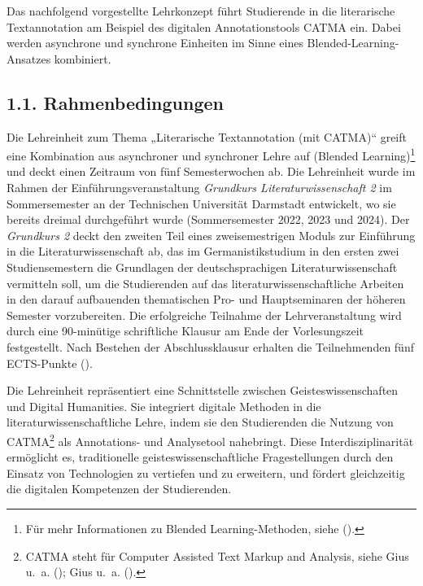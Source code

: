 \documentclass[
          a4paper,
        ]{article}
\begin{document}
Das nachfolgend vorgestellte Lehrkonzept führt Studierende in die
literarische Textannotation am Beispiel des digitalen Annotationstools
CATMA ein. Dabei werden asynchrone und synchrone Einheiten im Sinne
eines Blended-Learning-Ansatzes kombiniert.

\subsection{1.1. Rahmenbedingungen}\label{rahmenbedingungen}

Die Lehreinheit zum Thema „Literarische Textannotation (mit CATMA)``
greift eine Kombination aus asynchroner und synchroner Lehre auf
(Blended Learning)\footnote{Für mehr Informationen zu Blended
  Learning-Methoden, siehe ().} und deckt einen Zeitraum von fünf
Semesterwochen ab. Die Lehreinheit wurde im Rahmen der
Einführungsveranstaltung \emph{Grundkurs Literaturwissenschaft 2} im
Sommersemester an der Technischen Universität Darmstadt entwickelt, wo
sie bereits dreimal durchgeführt wurde (Sommersemester 2022, 2023 und
2024). Der \emph{Grundkurs 2} deckt den zweiten Teil eines
zweisemestrigen Moduls zur Einführung in die Literaturwissenschaft ab,
das im Germanistikstudium in den ersten zwei Studiensemestern die
Grundlagen der deutschsprachigen Literaturwissenschaft vermitteln soll,
um die Studierenden auf das literaturwissenschaftliche Arbeiten in den
darauf aufbauenden thematischen Pro- und Hauptseminaren der höheren
Semester vorzubereiten. Die erfolgreiche Teilnahme der Lehrveranstaltung
wird durch eine 90-minütige schriftliche Klausur am Ende der
Vorlesungszeit festgestellt. Nach Bestehen der Abschlussklausur erhalten
die Teilnehmenden fünf ECTS-Punkte
().

Die Lehreinheit repräsentiert eine Schnittstelle zwischen
Geisteswissenschaften und Digital Humanities. Sie integriert digitale
Methoden in die literaturwissenschaftliche Lehre, indem sie den
Studierenden die Nutzung von CATMA\footnote{CATMA steht für Computer
  Assisted Text Markup and Analysis, siehe Gius u.~a.
  (); Gius u.~a.
  ().} als Annotations- und
Analysetool nahebringt. Diese Interdisziplinarität ermöglicht es,
traditionelle geisteswissenschaftliche Fragestellungen durch den Einsatz
von Technologien zu vertiefen und zu erweitern, und fördert gleichzeitig
die digitalen Kompetenzen der Studierenden.
\end{document}
